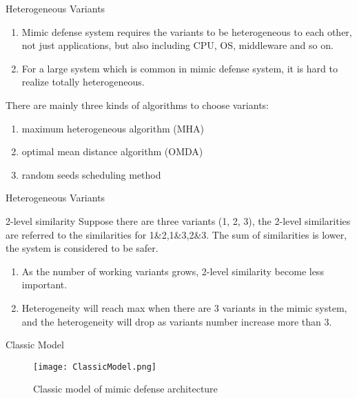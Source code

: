 \documentclass{beamer}
\begin{document}
\begin{frame}{Heterogeneous Variants}
    \begin{block}{}
        \begin{enumerate}
            \item Mimic defense system requires the variants to be heterogeneous to each other, not just applications, but also including CPU, OS, middleware and so on.
            \item For a large system which is common in mimic defense system, it is hard to realize totally heterogeneous. 
        \end{enumerate}
    \end{block}
    There are mainly three kinds of algorithms to choose variants: 
    \begin{block}{}
        \begin{enumerate}
            \item maximum heterogeneous algorithm (MHA)
            \item optimal mean distance algorithm (OMDA) 
            \item random seeds scheduling method 
        \end{enumerate}
    \end{block}
\end{frame}
\begin{frame}{Heterogeneous Variants}
    \begin{block}{2-level similarity}
    Suppose there are three variants (1, 2, 3), the 2-level similarities are referred to the similarities for 1\&2,1\&3,2\&3. The sum of similarities is lower, the system is considered to be safer.
    \end{block}
    \begin{block}{}
        \begin{enumerate}
            \item As the number of working variants grows, 2-level similarity become less important. 
            \item Heterogeneity will reach max when there are 3 variants in the mimic system, and the heterogeneity will drop as variants number increase more than 3.
        \end{enumerate}
    \end{block}
\end{frame}
\begin{frame}{Classic Model}
    \begin{figure}[!]
        \centering
        \texttt{[image: ClassicModel.png]}
        \caption{Classic model of mimic defense architecture}
    \end{figure}
\end{frame}
\end{document}
